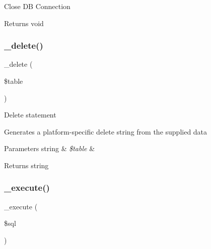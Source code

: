 Close DB Connection

\begin{DoxyReturn}{Returns}
void 
\end{DoxyReturn}
\mbox{\label{class_c_i___d_b__oci8__driver_a133ea8446ded52589bd22cc9163d0896}} 
\subsubsection{\texorpdfstring{\+\_\+delete()}{\_delete()}}
{\footnotesize\ttfamily \+\_\+delete (\begin{DoxyParamCaption}\item[{}]{\$table }\end{DoxyParamCaption})\hspace{0.3cm}{\ttfamily [protected]}}

Delete statement

Generates a platform-\/specific delete string from the supplied data


\begin{DoxyParams}[1]{Parameters}
string & {\em \$table} & \\
\hline
\end{DoxyParams}
\begin{DoxyReturn}{Returns}
string 
\end{DoxyReturn}
\mbox{\label{class_c_i___d_b__oci8__driver_a114ab675d89bf8324a41785fb475e86d}} 
\subsubsection{\texorpdfstring{\+\_\+execute()}{\_execute()}}
{\footnotesize\ttfamily \+\_\+execute (\begin{DoxyParamCaption}\item[{}]{\$sql }\end{DoxyParamCaption})\hspace{0.3cm}{\ttfamily [protected]}}

